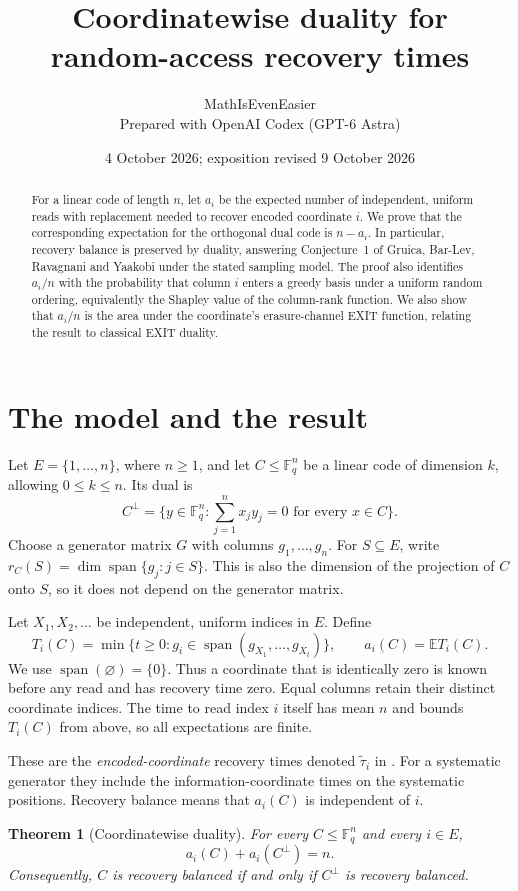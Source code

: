 \documentclass[11pt]{article}
\title{Coordinatewise duality for random-access recovery times}
\author{MathIsEvenEasier\\\small Prepared with OpenAI Codex (GPT-6 Astra)}
\date{4 October 2026; exposition revised 9 October 2026}
\newtheorem{theorem}{Theorem}
\theoremstyle{remark}
\newcommand{\F}{\mathbb F}
\newcommand{\E}{\mathbb E}
\newcommand{\spn}{\operatorname{span}}
\begin{document}
\maketitle
\begin{abstract}
For a linear code of length $n$, let $a_i$ be the expected number of independent,
uniform reads with replacement needed to recover encoded coordinate $i$.
We prove that the corresponding expectation for the
orthogonal dual code is $n-a_i$. In particular, recovery balance is preserved
by duality, answering Conjecture~1 of Gruica, Bar-Lev, Ravagnani and Yaakobi
under the stated sampling model. The proof also identifies $a_i/n$ with the
probability that column $i$ enters a greedy basis under a uniform random
ordering, equivalently the Shapley value of the column-rank function.
We also show that $a_i/n$ is the area under the coordinate's erasure-channel
EXIT function, relating the result to classical EXIT duality.
\end{abstract}

\section{The model and the result}
Let $E=\{1,\ldots,n\}$, where $n\geq1$, and let $C\leq\F_q^n$ be a linear
code of dimension $k$, allowing $0\leq k\leq n$. Its dual is
\[
 C^\perp=\{y\in\F_q^n:\textstyle\sum_{j=1}^n x_jy_j=0
               \text{ for every }x\in C\}.
\]
Choose a generator matrix $G$ with columns $g_1,\ldots,g_n$.
For $S\subseteq E$, write $r_C(S)=\dim\spn\{g_j:j\in S\}$.
This is also the dimension of the projection of $C$ onto $S$, so it does not
depend on the generator matrix.

Let $X_1,X_2,\ldots$ be independent, uniform indices in $E$. Define
\[
 T_i(C)=\min\{t\geq0:g_i\in\spn(g_{X_1},\ldots,g_{X_t})\},
 \qquad a_i(C)=\E T_i(C).
\]
We use $\spn(\varnothing)=\{0\}$. Thus a coordinate that is identically zero
is known before any read and has recovery time zero. Equal columns retain
their distinct coordinate indices. The time to read index $i$ itself has
mean $n$ and bounds $T_i(C)$ from above, so all expectations are finite.

These are the \emph{encoded-coordinate} recovery times denoted
$\widetilde\tau_i$ in \cite{GBRY}. For a systematic generator they include the
information-coordinate times on the systematic positions. Recovery balance
means that $a_i(C)$ is independent of $i$.

\begin{theorem}[Coordinatewise duality]\label{thm:main}
For every $C\leq\F_q^n$ and every $i\in E$,
\begin{equation}\label{eq:main}
                 a_i(C)+a_i(C^\perp)=n.
\end{equation}
Consequently, $C$ is recovery balanced if and only if $C^\perp$ is recovery
balanced.
\end{theorem}
\end{document}
